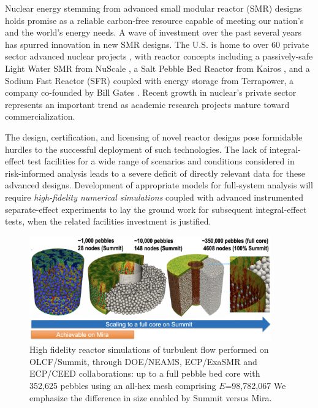 


Nuclear energy stemming from advanced small modular reactor (SMR) designs
holds promise as a reliable carbon-free resource capable of meeting our
nation's and the world's energy needs.  A wave of investment over the past
several years has spurred innovation in new SMR designs.
The U.S. is home to over 60 private sector advanced nuclear projects \cite{third_way},
with reactor concepts including a passively-safe Light Water SMR from NuScale \cite{nuscale},
a Salt Pebble Bed Reactor from Kairos \cite{kairos},
and a Sodium Fast Reactor (SFR) coupled with energy storage from Terrapower,
a company co-founded by Bill Gates \cite{natrium}. Recent growth in nuclear's private
sector represents an important trend as academic research projects mature
toward commercialization.

The design, certification, and licensing of novel reactor designs pose
formidable hurdles to the successful deployment of such technologies.
The lack of integral-effect test facilities for a wide range of scenarios and
conditions considered in risk-informed analysis leads to a severe deficit of
directly relevant data for these advanced designs.  Development of  appropriate
models for full-system analysis will require {\em high-fidelity numerical
simulations} coupled with advanced instrumented separate-effect experiments to
lay the ground work for subsequent integral-effect tests, when the related
facilities investment is justified.

\begin{figure}[!ht]
\centering
\includegraphics[width=0.93\textwidth]{figs/pebble01.png}
 \caption{\label{fig:350k} High fidelity reactor simulations of turbulent flow performed on OLCF/Summit,
  through DOE/NEAMS, ECP/ExaSMR and ECP/CEED collaborations:  
  up to a full pebble bed core with 352,625 pebbles using an all-hex mesh comprising $E$=98,782,067 
  We emphasize the difference in size enabled by Summit versus Mira.}
\end{figure}

